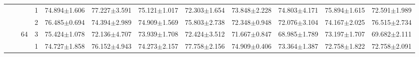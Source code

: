 \begin{table}[htpb]
{\begin{tabular}{c|c|c|c|ll|ll|ll|ll}
                                 &                                                                                 &                                                                                        & 1                                                                                         & 74.894$\pm$1.606                        & 77.227$\pm$3.591                        & 75.121$\pm$1.017                        & 72.303$\pm$1.654                        & 73.848$\pm$2.228                        & 74.803$\pm$4.171                        & 75.894$\pm$1.615                        & 72.591$\pm$1.989                       \\
                                 &                                                                                 &                                                                                        & 2                                                                                         & 76.485$\pm$0.694                        & 74.394$\pm$2.989                        & 74.909$\pm$1.569                        & 75.803$\pm$2.738                        & 72.348$\pm$0.948                        & 72.076$\pm$3.104                        & 74.167$\pm$2.025                        & 76.515$\pm$2.734                       \\
                                 &                                                                                 & \multirow{-3}{*}{64}                                                                   & 3                                                                                         & 75.424$\pm$1.078                        & 72.136$\pm$4.707                        & 73.939$\pm$1.708                        & 72.424$\pm$3.512                        & 71.667$\pm$0.847                        & 68.985$\pm$1.789                        & 73.197$\pm$1.707                        & 69.682$\pm$2.111                       \\ \cline{3-12} 
                                 &                                                                                 &                                                                                        & 1                                                                                         & 74.727$\pm$1.858                        & 76.152$\pm$4.943                        & 74.273$\pm$2.157                        & 77.758$\pm$2.156                        & 74.909$\pm$0.406                        & 73.364$\pm$1.387                        & 72.758$\pm$1.822                        & 72.758$\pm$2.091                       \\

\end{tabular}}
\end{table}
